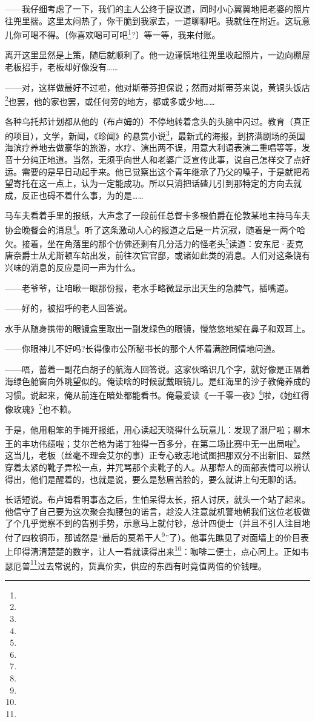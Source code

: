 \par ——我仔细考虑了一下，我们的主人公终于提议道，同时小心翼翼地把老婆的照片往兜里揣。这里太闷热了，你干脆到我家去，一道聊聊吧。我就住在附近。这玩意儿你可喝不得。〔你喜欢喝可可吧\footnote{}?〕等一等，我来付账。
\par 离开这里显然是上策，随后就顺利了。他一边谨慎地往兜里收起照片，一边向棚屋老板招手，老板却好像没有……
\par ——对，这样做最好不过啦，他对斯蒂芬担保说；然而对斯蒂芬来说，黄铜头饭店\footnote{}也罢，他的家也罢，或任何旁的地方，都或多或少地……
\par 各种乌托邦计划都从他的（布卢姆的）不停地转着念头的头脑中闪过。教育（真正的项目），文学，新闻，《珍闻》的悬赏小说\footnote{}，最新式的海报，到挤满剧场的英国海滨疗养地去做豪华的旅游，水疗、演出两不误，用意大利语表演二重唱等等，发音十分纯正地道。当然，无须乎向世人和老婆广泛宣传此事，说自己怎样交了点好运。需要的是早日动起手来。他已觉察出这个青年继承了乃父的嗓子，于是就把希望寄托在这一点上，认为一定能成功。所以只消把话碴儿引到那特定的方向去就成，反正也碍不着什么事，为的是……
\par 马车夫看着手里的报纸，大声念了一段前任总督卡多根伯爵在伦敦某地主持马车夫协会晚餐会的消息\footnote{}。听了这条激动人心的报道之后是一片沉寂，随着是一两个哈欠。接着，坐在角落里的那个仿佛还剩有几分活力的怪老头\footnote{}读道：安东尼·麦克唐奈爵士从尤斯顿车站出发，前往次官官邸，或诸如此类的消息。人们对这条饶有兴味的消息的反应是问一声为什么。
\par ——老爷爷，让咱瞅一眼那份报，老水手略微显示出天生的急脾气，插嘴道。
\par ——好的，被招呼的老人回答说。
\par 水手从随身携带的眼镜盒里取出一副发绿色的眼镜，慢悠悠地架在鼻子和双耳上。
\par ——你眼神儿不好吗?长得像市公所秘书长的那个人怀着满腔同情地问道。
\par ——唔，蓄着一副花白胡子的航海人回答说。这家伙略识几个字，就好像是正隔着海绿色舱窗向外眺望似的。俺读啥的时候就戴眼镜儿。是红海里的沙子教俺养成的习惯。说起来，俺从前连在暗处都能看书。俺最爱读《一千零一夜》\footnote{}啦，《她红得像玫瑰》\footnote{}也不赖。
\par 于是，他用粗笨的手摊开报纸，用心读起天晓得什么玩意儿：发现了溺尸啦；柳木王的丰功伟绩啦；艾尔芒格为诺丁独得一百多分，在第二场比赛中无一出局啦\footnote{}。这当儿，老板（丝毫不理会艾尔的事）正专心致志地试图把那双分不出新旧、显然穿着太紧的靴子弄松一点，并咒骂那个卖靴子的人。从那帮人的面部表情可以辨认得出，他们是醒着的，也就是说，要么是愁眉苦脸的，要么就讲上句无聊的话。
\par 长话短说。布卢姆看明事态之后，生怕呆得太长，招人讨厌，就头一个站了起来。他信守了自己要为这次聚会掏腰包的诺言，趁没人注意就机警地朝我们这位老板做了个几乎觉察不到的告别手势，示意马上就付钞，总计四便士（并且不引人注目地付了四枚铜币，那诚然是“最后的莫希干人\footnote{}”了）。他事先瞧见了对面墙上的价目表上印得清清楚楚的数字，让人一看就读得出来\footnote{}：咖啡二便士，点心同上。正如韦瑟厄普\footnote{}过去常说的，货真价实，供应的东西有时竟值两倍的价钱哩。
